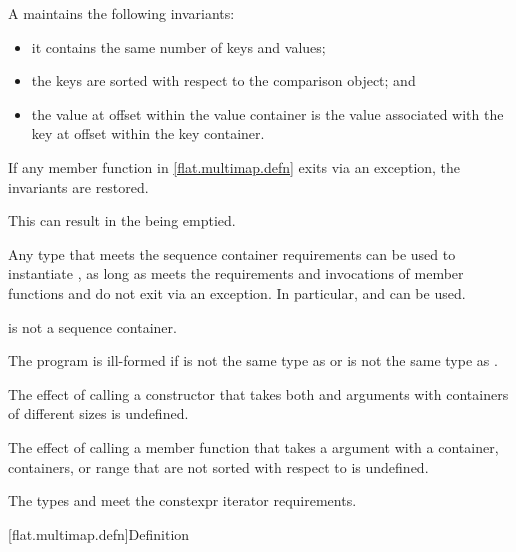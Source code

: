 \pnum
A  maintains the following invariants:
\begin{itemize}
\item
it contains the same number of keys and values;
\item
the keys are sorted with respect to the comparison object; and
\item
the value at offset  within the value container is the value
associated with the key at offset  within the key container.
\end{itemize}

\pnum
If any member function in \ref{flat.multimap.defn} exits via an exception,
the invariants are restored.
\begin{note}
This can result in the  being emptied.
\end{note}

\pnum
Any type 
that meets the sequence container requirements
can be used to instantiate ,
as long as
 meets the  requirements and
invocations of
member functions  and  do not exit via an exception.
In particular,
 and  can be used.
\begin{note}
 is not a sequence container.
\end{note}

\pnum
The program is ill-formed if
 is not the same type as  or
 is not the same type as .

\pnum
The effect of calling a constructor
that takes both  and
 arguments
with containers of different sizes is undefined.

\pnum
The effect of calling a member function
that takes a  argument
with a container, containers, or range
that are not sorted with respect to  is undefined.

\pnum
The types  and  meet
the constexpr iterator requirements.

[flat.multimap.defn]{Definition}

